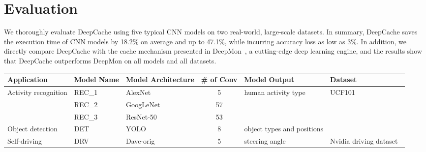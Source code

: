 \documentclass[10pt,acmtog]{acmart}
\newcommand{\framework}{DeepCache\xspace}
\newcommand{\sys}{\framework{}}
\newcommand{\revise}[1]{{#1}}
\begin{document}
\section{Evaluation}\label{sec:eval}
We thoroughly evaluate \framework using five typical CNN models on two real-world, large-scale datasets.
In summary, \framework saves the execution time of CNN models by 18.2\% on average and up to 47.1\%, while incurring accuracy loss as low as 3\%.
\revise{
In addition, we directly compare \sys{} with the cache mechanism presented in DeepMon~\cite{conf/mobisys/LocLB17}, a cutting-edge deep learning engine, and the results show that \sys{} outperforms DeepMon on all models and all datasets.}%
\small
\centering
\begin{tabular}{|l|l|l|c|l|l|} \hline
	\textbf{Application} & \textbf{Model Name} & \textbf{Model Architecture} & \textbf{\# of Conv} & \textbf{Model Output} & \textbf{Dataset}\\ \hline
	\multirow{3}{*}{Activity recognition} & REC\_1 & AlexNet~\cite{alexnet} & 5 & \multirow{3}{*}{human activity type} & \multirow{4}{*}{UCF101~\cite{UCF101}}\\ \cline{2-4}
	& REC\_2 & GoogLeNet~\cite{Inception} & 57 & &\\ \cline{2-4}
	& REC\_3 & ResNet-50~\cite{ResNet} & 53 & &\\ \cline{1-5}
	Object detection & DET & YOLO~\cite{yolo} & 8 & object types and positions &\\ \hline
	Self-driving & DRV & Dave-orig~\cite{bojarski2016end,Autopilot} & 5 & steering angle & Nvidia driving dataset~\cite{nvidia-driving-dataset}\\ \hline
\end{tabular}
\caption{List of CNN models used to evaluate \framework.}
\label{tab:models}
\end{document}
